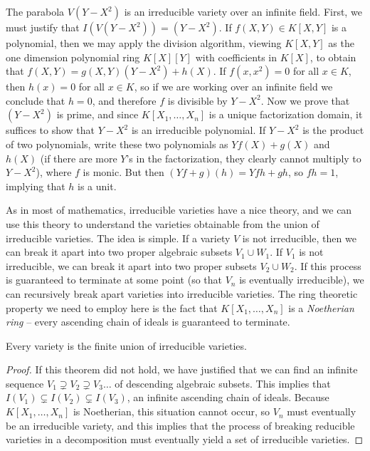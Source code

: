 \begin{example}
    The parabola $V(Y - X^2)$ is an irreducible variety over an infinite field. First, we must justify that $I(V(Y - X^2)) = (Y - X^2)$. If $f(X,Y) \in K[X,Y]$ is a polynomial, then we may apply the division algorithm, viewing $K[X,Y]$ as the one dimension polynomial ring $K[X][Y]$ with coefficients in $K[X]$, to obtain that $f(X,Y) = g(X,Y) (Y - X^2) + h(X)$. If $f(x,x^2) = 0$ for all $x \in K$, then $h(x) = 0$ for all $x \in K$, so if we are working over an infinite field we conclude that $h = 0$, and therefore $f$ is divisible by $Y - X^2$. Now we prove that $(Y - X^2)$ is prime, and since $K[X_1, \dots, X_n]$ is a unique factorization domain, it suffices to show that $Y - X^2$ is an irreducible polynomial. If $Y - X^2$ is the product of two polynomials, write these two polynomials as $Yf(X) + g(X)$ and $h(X)$ (if there are more $Y$'s in the factorization, they clearly cannot multiply to $Y - X^2$), where $f$ is monic. But then $(Yf + g)(h) = Yfh + gh$, so $fh = 1$, implying that $h$ is a unit.
\end{example}

As in most of mathematics, irreducible varieties have a nice theory, and we can use this theory to understand the varieties obtainable from the union of irreducible varieties. The idea is simple. If a variety $V$ is not irreducible, then we can break it apart into two proper algebraic subsets $V_1 \cup W_1$. If $V_1$ is not irreducible, we can break it apart into two proper subsets $V_2 \cup W_2$. If this process is guaranteed to terminate at some point (so that $V_n$ is eventually irreducible), we can recursively break apart varieties into irreducible varieties. The ring theoretic property we need to employ here is the fact that $K[X_1, \dots, X_n]$ is a {\it Noetherian ring} -- every ascending chain of ideals is guaranteed to terminate.

\begin{prop}
    Every variety is the finite union of irreducible varieties.
\end{prop}
\begin{proof}
    If this theorem did not hold, we have justified that we can find an infinite sequence $V_1 \supsetneq V_2 \supsetneq V_3 \dots$ of descending algebraic subsets. This implies that $I(V_1) \subsetneq I(V_2) \subsetneq I(V_3)$, an infinite ascending chain of ideals. Because $K[X_1, \dots, X_n]$ is Noetherian, this situation cannot occur, so $V_n$ must eventually be an irreducible variety, and this implies that the process of breaking reducible varieties in a decomposition must eventually yield a set of irreducible varieties.
\end{proof}

